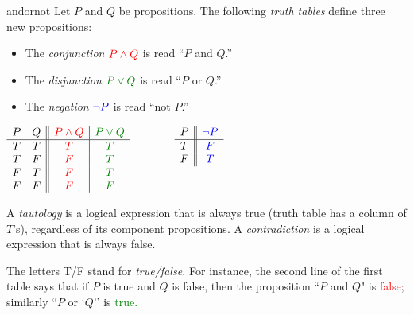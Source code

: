 \begin{defn}{}{andornot}
	Let $P$ and $Q$ be propositions. The following \emph{truth tables} define three new propositions:\par
	\begin{minipage}[t]{0.5\linewidth}\vspace{0pt}
		\begin{itemize}
		  \item The \emph{conjunction} $\textcolor{red}{P\wedge Q}$ is read ``$P$ and $Q$.''
		  \item The \emph{disjunction} $\textcolor{Green}{P\vee Q}$ is read ``$P$ or $Q$.''
		  \item The \emph{negation} $\textcolor{blue}{\neg P}$ is read ``not $P$.''
		\end{itemize} 
	\end{minipage}
	\hfill
	\begin{minipage}[t]{0.49\linewidth}\vspace{-6pt}
		$\begin{array}{cc||c|c}
			P & Q & \textcolor{red}{P\wedge Q} & \textcolor{Green}{P\vee Q}\\\hline
			T & T & \textcolor{red}{T} & \textcolor{Green}{T}\\
			T & F & \textcolor{red}{F} & \textcolor{Green}{T}\\
			F & T & \textcolor{red}{F} & \textcolor{Green}{T}\\
			F & F & \textcolor{red}{F} & \textcolor{Green}{F}
		\end{array}
		\qquad\qquad
		\begin{array}[b]{c||c}
			P & \textcolor{blue}{\neg P}\\\hline
			T & \textcolor{blue}{F}\\
			F & \textcolor{blue}{T}
		\end{array}$
	\end{minipage}\medbreak
	A \emph{tautology} is a logical expression that is always true (truth table has a column of $T$'s), regardless of its component propositions. A \emph{contradiction} is a logical expression that is always false.
\end{defn}

The letters T/F stand for \emph{true/false.} For instance, the second line of the first table says that if $P$ is true and $Q$ is false, then the proposition ``$P$ and $Q$" is \textcolor{red}{false}; similarly ``$P$ or `$Q$'' is \textcolor{Green}{true.}

